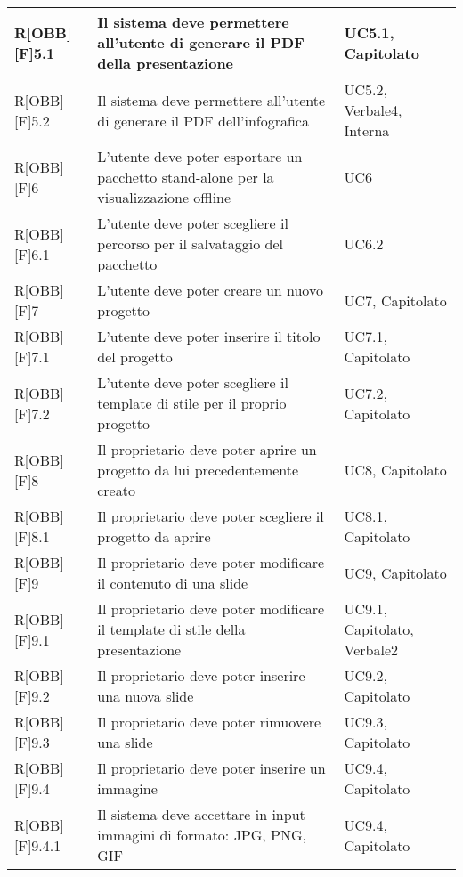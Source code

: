 \begin{table}[h]
\begin{tabular}{|p{}|p{}|p{}|}
		\end{tabular}
	\end{table}
	\newpage
	
	\begin{table}[h]
		\begin{tabular}{|p{}|p{}|p{}|}
			\midrule

R[OBB][F]5.1 & Il sistema deve permettere all'utente di generare il PDF della presentazione & UC5.1, Capitolato \\ \midrule
R[OBB][F]5.2 & Il sistema deve permettere all'utente di generare il PDF dell'infografica & UC5.2, Verbale4, Interna \\ \midrule
R[OBB][F]6 & L'utente deve poter esportare un pacchetto stand-alone per la visualizzazione offline & UC6 \\ \midrule
R[OBB][F]6.1 & L'utente deve poter scegliere il percorso per il salvataggio del pacchetto & UC6.2 \\ \midrule
R[OBB][F]7 & L'utente deve poter creare un nuovo progetto & UC7, Capitolato \\ \midrule
R[OBB][F]7.1 & L'utente deve poter inserire il titolo del progetto & UC7.1, Capitolato \\ \midrule
R[OBB][F]7.2 & L'utente deve poter scegliere il template di stile per il proprio progetto & UC7.2, Capitolato \\ \midrule
R[OBB][F]8 & Il proprietario deve poter aprire un progetto da lui precedentemente creato & UC8, Capitolato \\ \midrule
R[OBB][F]8.1 & Il proprietario deve poter scegliere il progetto da aprire & UC8.1, Capitolato \\ \midrule
R[OBB][F]9 & Il proprietario deve poter modificare il contenuto di una slide & UC9, Capitolato \\ \midrule
R[OBB][F]9.1 & Il proprietario deve poter modificare il template di stile della presentazione & UC9.1, Capitolato, Verbale2 \\ \midrule
R[OBB][F]9.2 & Il proprietario deve poter inserire una nuova slide & UC9.2, Capitolato \\ \midrule
R[OBB][F]9.3 & Il proprietario deve poter rimuovere una slide & UC9.3, Capitolato \\ \midrule
R[OBB][F]9.4 & Il proprietario deve poter inserire un immagine & UC9.4, Capitolato \\ \midrule
R[OBB][F]9.4.1 & Il sistema deve accettare in input immagini di formato: JPG, PNG, GIF & UC9.4, Capitolato \\ \midrule

\end{tabular}
\end{table}
